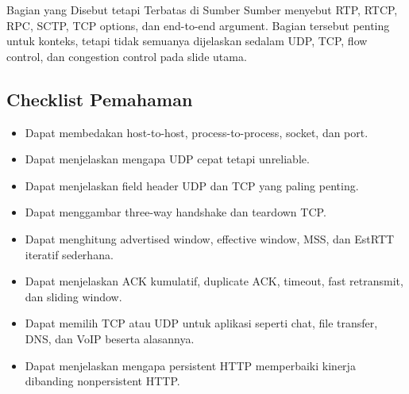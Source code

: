 \begin{cmt}{Bagian yang Disebut tetapi Terbatas di Sumber}{}
Sumber menyebut RTP, RTCP, RPC, SCTP, TCP options, dan end-to-end argument. Bagian tersebut penting untuk konteks, tetapi tidak semuanya dijelaskan sedalam UDP, TCP, flow control, dan congestion control pada slide utama.
\end{cmt}

\subsection{Checklist Pemahaman}

\begin{itemize}
    \item Dapat membedakan host-to-host, process-to-process, socket, dan port.
    \item Dapat menjelaskan mengapa UDP cepat tetapi unreliable.
    \item Dapat menjelaskan field header UDP dan TCP yang paling penting.
    \item Dapat menggambar three-way handshake dan teardown TCP.
    \item Dapat menghitung advertised window, effective window, MSS, dan EstRTT iteratif sederhana.
    \item Dapat menjelaskan ACK kumulatif, duplicate ACK, timeout, fast retransmit, dan sliding window.
    \item Dapat memilih TCP atau UDP untuk aplikasi seperti chat, file transfer, DNS, dan VoIP beserta alasannya.
    \item Dapat menjelaskan mengapa persistent HTTP memperbaiki kinerja dibanding nonpersistent HTTP.
\end{itemize}
